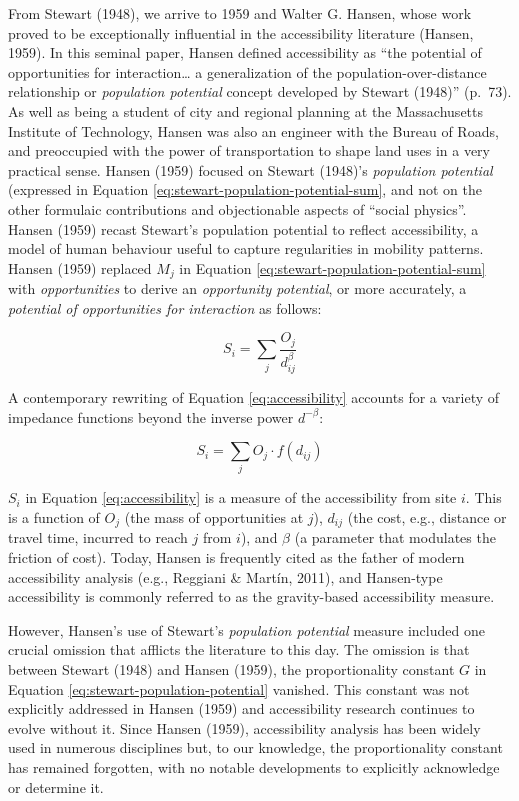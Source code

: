 \documentclass[
11pt, %
oneside, %
english, %
singlespacing, %
]{macthesis} %
\begin{document}
From Stewart (1948), we arrive to 1959 and Walter G. Hansen, whose work proved to be exceptionally influential in the accessibility literature (Hansen, 1959). In this seminal paper, Hansen defined accessibility as ``the potential of opportunities for interaction\ldots{} a generalization of the population-over-distance relationship or \emph{population potential} concept developed by Stewart (1948)'' (p.~73). As well as being a student of city and regional planning at the Massachusetts Institute of Technology, Hansen was also an engineer with the Bureau of Roads, and preoccupied with the power of transportation to shape land uses in a very practical sense. Hansen (1959) focused on Stewart (1948)'s \emph{population potential} (expressed in Equation \ref{eq:stewart-population-potential-sum}, and not on the other formulaic contributions and objectionable aspects of ``social physics''. Hansen (1959) recast Stewart's population potential to reflect accessibility, a model of human behaviour useful to capture regularities in mobility patterns. Hansen (1959) replaced \(M_j\) in Equation \ref{eq:stewart-population-potential-sum} with \emph{opportunities} to derive an \emph{opportunity potential}, or more accurately, a \emph{potential of opportunities for interaction} as follows:

\begin{equation}
\label{eq:accessibility}
S_{i} = \sum_j \frac{O_j }{d_{ij}^\beta}
\end{equation} 

A contemporary rewriting of Equation \ref{eq:accessibility} accounts for a variety of impedance functions beyond the inverse power \(d^{-\beta}\):

\begin{equation}
\label{eq:accessibility-general}
S_{i} = \sum_j O_j \cdot f(d_{ij})
\end{equation} 

\(S_{i}\) in Equation \ref{eq:accessibility} is a measure of the accessibility from site \(i\). This is a function of \(O_j\) (the mass of opportunities at \(j\)), \(d_{ij}\) (the cost, e.g., distance or travel time, incurred to reach \(j\) from \(i\)), and \(\beta\) (a parameter that modulates the friction of cost). Today, Hansen is frequently cited as the father of modern accessibility analysis (e.g., Reggiani \& Martín, 2011), and Hansen-type accessibility is commonly referred to as the gravity-based accessibility measure.

However, Hansen's use of Stewart's \emph{population potential} measure included one crucial omission that afflicts the literature to this day. The omission is that between Stewart (1948) and Hansen (1959), the proportionality constant \(G\) in Equation \ref{eq:stewart-population-potential} vanished. This constant was not explicitly addressed in Hansen (1959) and accessibility research continues to evolve without it. Since Hansen (1959), accessibility analysis has been widely used in numerous disciplines but, to our knowledge, the proportionality constant has remained forgotten, with no notable developments to explicitly acknowledge or determine it.
\end{document}
